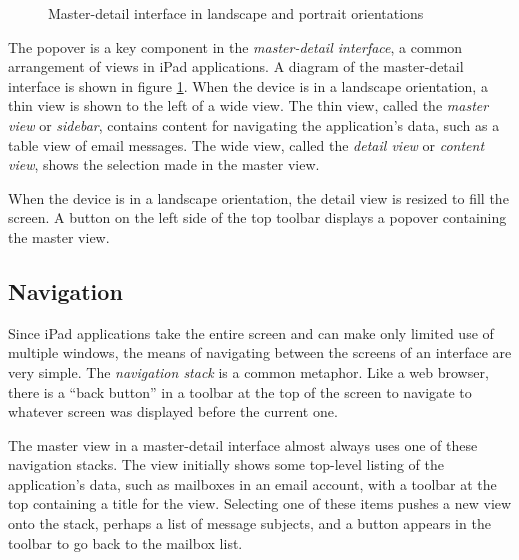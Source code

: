 \begin{figure}
    \caption{\label{fig:master_detail} Master-detail interface in landscape
    and portrait orientations}
\end{figure}

The popover is a key component in the \emph{master-detail interface}, a common
arrangement of views in iPad applications. A diagram of the master-detail
interface is shown in figure \ref{fig:master_detail}. When the device is in a
landscape orientation, a thin view is shown to the left of a wide view. The thin
view, called the \emph{master view} or \emph{sidebar}, contains content for
navigating the application's data, such as a table view of email messages. The
wide view, called the \emph{detail view} or \emph{content view}, shows the
selection made in the master view.

When the device is in a landscape orientation, the detail view is resized to
fill the screen. A button on the left side of the top toolbar displays a popover
containing the master view.

\subsection{Navigation}
\label{sect:ipad_navigation}

Since iPad applications take the entire screen and can make only limited use of
multiple windows, the means of navigating between the screens of an interface
are very simple. The \emph{navigation stack} is a common metaphor. Like a web
browser, there is a ``back button'' in a toolbar at the top of the screen to
navigate to whatever screen was displayed before the current one.

The master view in a master-detail interface almost always uses one of these
navigation stacks. The view initially shows some top-level listing of the
application's data, such as mailboxes in an email account, with a toolbar at the
top containing a title for the view. Selecting one of these items pushes a new
view onto the stack, perhaps a list of message subjects, and a button appears
in the toolbar to go back to the mailbox list.

